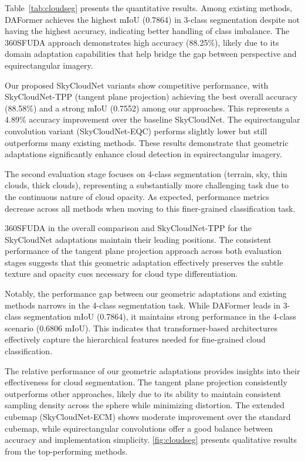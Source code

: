 \documentclass[conference]{IEEEtran}
\begin{document}
Table~\ref{tab:cloudseg} presents the quantitative results.
Among existing methods, DAFormer \cite{hoyer2022daformer} achieves the highest mIoU (0.7864) in 3-class segmentation despite not having the highest accuracy, indicating better handling of class imbalance.
The 360SFUDA approach \cite{zheng2024semantics} demonstrates high accuracy (88.25\%), likely due to its domain adaptation capabilities that help bridge the gap between perspective and equirectangular imagery.

Our proposed SkyCloudNet variants show competitive performance, with SkyCloudNet-TPP (tangent plane projection) achieving the best overall accuracy (88.58\%) and a strong mIoU (0.7552) among our approaches. This represents a 4.89\% accuracy improvement over the baseline SkyCloudNet. The equirectangular convolution variant (SkyCloudNet-EQC) performs slightly lower but still outperforms many existing methods.
These results demonstrate that geometric adaptations significantly enhance cloud detection in equirectangular imagery.

The second evaluation stage focuses on 4-class segmentation (terrain, sky, thin clouds, thick clouds), representing a substantially more challenging task due to the continuous nature of cloud opacity. As expected, performance metrics decrease across all methods when moving to this finer-grained classification task.

360SFUDA in the overall comparison and SkyCloudNet-TPP for the SkyCloudNet adaptations maintain their leading positions.
The consistent performance of the tangent plane projection approach across both evaluation stages suggests that this geometric adaptation effectively preserves the subtle texture and opacity cues necessary for cloud type differentiation.

Notably, the performance gap between our geometric adaptations and existing methods narrows in the 4-class segmentation task. While DAFormer leads in 3-class segmentation mIoU (0.7864), it maintains strong performance in the 4-class scenario (0.6806 mIoU). This indicates that transformer-based architectures effectively capture the hierarchical features needed for fine-grained cloud classification.

The relative performance of our geometric adaptations provides insights into their effectiveness for cloud segmentation.
The tangent plane projection consistently outperforms other approaches, likely due to its ability to maintain consistent sampling density across the sphere while minimizing distortion.
The extended cubemap (SkyCloudNet-ECM) shows moderate improvement over the standard cubemap, while equirectangular convolutions offer a good balance between accuracy and implementation simplicity.
\autoref{fig:cloudseg} presents qualitative results from the top-performing methods.
\end{document}
